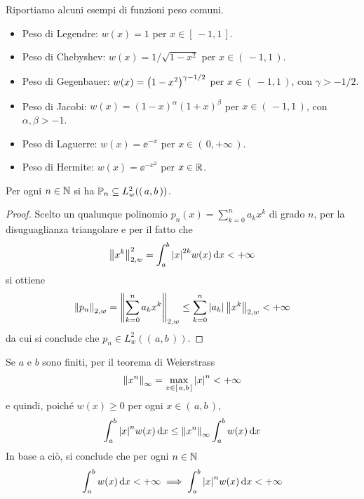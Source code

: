 	\begin{esempio}\label{eg:funzioni-peso}
		Riportiamo alcuni esempi di funzioni peso comuni.
			\begin{itemize}
				\item Peso di Legendre: \(w (x) = 1\) per \(x \in [\, -1, 1\,]\).
				\item Peso di Chebyshev: \(w (x) = 1 / \sqrt{1 - x^2}\) per \(x \in (\, -1, 1 \,)\).
				\item Peso di Gegenbauer: \(w (x) = \qty(1 - x^2)^{\gamma - 1 / 2}\) per \(x \in (\, -1, 1 \,)\), con \(\gamma > - 1 / 2\).
				\item Peso di Jacobi: \(w (x) = (1 - x)^\alpha (1 + x)^\beta\) per \(x \in (\, -1, 1 \,)\), con \(\alpha, \beta > - 1\).
				\item Peso di Laguerre: \(w (x) = \ee^{-x}\) per \(x \in (\, 0, + \infty \,)\).
				\item Peso di Hermite: \(w (x) = \ee^{- x^2}\) per \(x \in \R\).
			\end{itemize}
	\end{esempio}

	\begin{teorema}
		Per ogni \(n \in \N\) si ha \(\P_n \subseteq L_w^2 ((\, a, b \,))\).
	\end{teorema}

	\begin{proof}
		Scelto un qualunque polinomio \(p_n (x) = \sum_{k = 0}^n a_k x^k\) di grado \(n\), per la disuguaglianza triangolare e per il fatto che
		\begin{equation*}
			\norm{x^k}_{2, w}^2 = \int_a^b \abs{x}^{2 k} w (x) \dd{x} < + \infty
		\end{equation*}
		si ottiene
		\begin{equation*}
			\norm{p_n}_{2, w} = \norm{\sum_{k = 0}^n a_k x^k}_{2, w} \le \sum_{k = 0}^n \abs{a_k} \, \norm{x^k}_{2, w} < + \infty
		\end{equation*}
		da cui si conclude che \(p_n \in L_w^2 ((\, a, b \,))\).
	\end{proof}

	\begin{osservazione}
		Se \(a\) e \(b\) sono finiti, per il teorema di Weierstrass
		\begin{equation*}
			\norm{x^n}_\infty = \max_{x \in [\, a, b \,]} \abs{x}^n < + \infty
		\end{equation*}
		e quindi, poiché \(w (x) \ge 0\) per ogni \(x \in (\, a, b \,)\),
		\begin{equation*}
			\int_a^b \abs{x}^n w (x) \dd{x} \le \norm{x^n}_\infty \int_a^b w (x) \dd{x}
		\end{equation*}
		In base a ciò, si conclude che per ogni \(n \in \N\)
		\begin{equation}
			\int_a^b w (x) \dd{x} < + \infty \implies \int_a^b \abs{x}^n w (x) \dd{x} < + \infty
		\end{equation}
	\end{osservazione}

